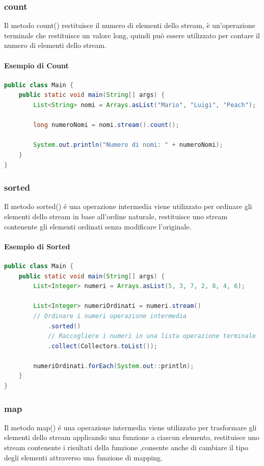 \documentclass[11pt]{article}
\begin{document}
\subsubsection{count}
Il metodo count() restituisce il numero di elementi dello stream, è un'operazione terminale che restituisce un valore long, quindi può essere utilizzato per contare il numero di elementi dello stream.
\paragraph{Esempio di Count}
\begin{lstlisting}[language=Java]
public class Main {
    public static void main(String[] args) {
        List<String> nomi = Arrays.asList("Mario", "Luigi", "Peach");

        long numeroNomi = nomi.stream().count();

        System.out.println("Numero di nomi: " + numeroNomi);
    }
}
\end{lstlisting}
\subsubsection{sorted}
Il metodo sorted() é una operazione intermedia viene utilizzato per ordinare gli elementi dello stream in base all'ordine naturale, restituisce uno stream contenente gli elementi ordinati senza modificare l'originale.
\paragraph{Esempio di Sorted}
\begin{lstlisting}[language=Java]
public class Main {
    public static void main(String[] args) {
        List<Integer> numeri = Arrays.asList(5, 3, 7, 2, 8, 4, 6);

        List<Integer> numeriOrdinati = numeri.stream()
        // Ordinare i numeri operazione intermedia
            .sorted()
            // Raccogliere i numeri in una lista operazione terminale
            .collect(Collectors.toList());

        numeriOrdinati.forEach(System.out::println);
    }
}
\end{lstlisting}
\subsubsection{map}
Il metodo map() é una operazione intermedia viene utilizzato per trasformare gli elementi dello stream applicando una funzione a ciascun elemento, restituisce uno stream contenente i risultati della funzione
,consente anche di cambiare il tipo degli elementi attraverso una funzione di mapping.
\end{document}
